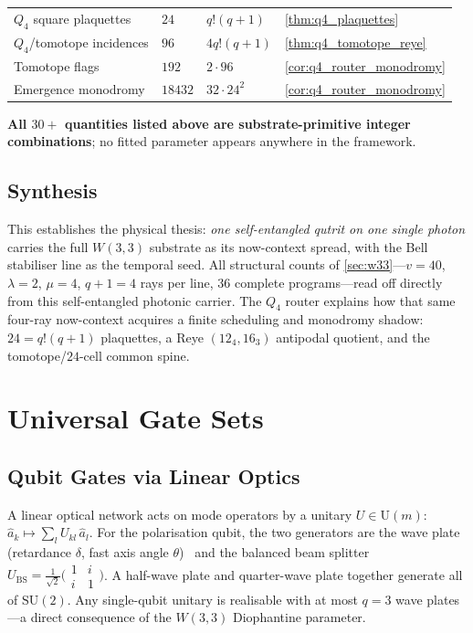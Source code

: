 ﻿\documentclass[12pt]{article}
\begin{document}
\begin{center}
\begin{tabular}{l l l l}
$Q_4$ square plaquettes           & $24$      & $q!(q+1)$                 & \cref{thm:q4_plaquettes} \\
$Q_4$/tomotope incidences         & $96$      & $4q!(q+1)$                & \cref{thm:q4_tomotope_reye} \\
Tomotope flags                    & $192$     & $2\cdot96$                & \cref{cor:q4_router_monodromy} \\
Emergence monodromy               & $18432$   & $32\cdot24^2$             & \cref{cor:q4_router_monodromy} \\
\bottomrule
\end{tabular}
\end{center}

\textbf{All $30+$ quantities listed above are substrate-primitive integer
combinations}; no fitted parameter appears anywhere in the framework.

\subsection{Synthesis}

This establishes the physical thesis: \emph{one self-entangled qutrit on one single
photon} carries the full $W(3,3)$ substrate as its now-context spread, with the
Bell stabiliser line as the temporal seed.  All structural counts of
\cref{sec:w33}---$v=40$, $\lambda=2$, $\mu=4$, $q+1=4$ rays per line, $36$ complete
programs---read off directly from this self-entangled photonic carrier.  The
$Q_4$ router explains how that same four-ray now-context acquires a finite
scheduling and monodromy shadow: $24=q!(q+1)$ plaquettes, a Reye
$(12_4,16_3)$ antipodal quotient, and the tomotope/$24$-cell common spine.

\section{Universal Gate Sets}
\label{sec:gates}

\subsection{Qubit Gates via Linear Optics}

A linear optical network acts on mode operators by a unitary $U \in \mathrm{U}(m)$:
$\hat{a}_k \mapsto \sum_l U_{kl}\,\hat{a}_l$.
For the polarisation qubit, the two generators are the wave plate (retardance
$\delta$, fast axis angle $\theta$)~\cite{Reck1994} and the balanced beam splitter
$U_\mathrm{BS} = \frac{1}{\sqrt{2}}\bigl(\begin{smallmatrix}1 & i \\ i & 1\end{smallmatrix}\bigr)$.
A half-wave plate and quarter-wave plate together generate all of $\mathrm{SU}(2)$.
Any single-qubit unitary is realisable with at most $q = 3$ wave plates---a direct
consequence of the $W(3,3)$ Diophantine parameter.
\end{document}
